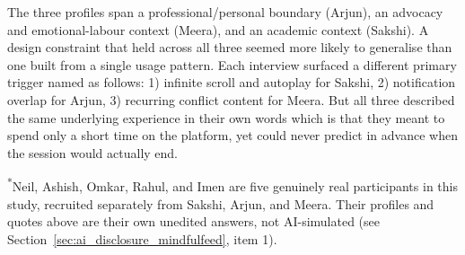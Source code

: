 \documentclass[11pt]{article}
\begin{document}
The three profiles span a professional/personal boundary (Arjun), an advocacy and emotional-labour context (Meera), and an academic context (Sakshi). A design constraint that held across all three seemed more likely to generalise than one built from a single usage pattern. Each interview surfaced a different primary trigger named as follows: 1) infinite scroll and autoplay for Sakshi, 2) notification overlap for Arjun, 3) recurring conflict content for Meera. But all three described the same underlying experience in their own words which is that they meant to spend only a short time on the platform, yet could never predict in advance when the session would actually end.

\textsuperscript{*}Neil, Ashish, Omkar, Rahul, and Imen are five genuinely real participants in this study, recruited separately from Sakshi, Arjun, and Meera. Their profiles and quotes above are their own unedited answers, not AI-simulated (see Section~\ref{sec:ai_disclosure_mindfulfeed}, item 1).
\end{document}
